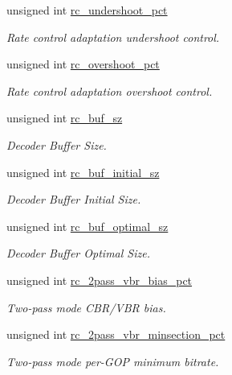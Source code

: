 \begin{DoxyCompactItemize}
unsigned int \hyperlink{structvpx__codec__enc__cfg_ad279fbb0a9fe9395340913161e28651a}{rc\-\_\-undershoot\-\_\-pct}
\begin{DoxyCompactList}\small\item\em \-Rate control adaptation undershoot control. \end{DoxyCompactList}\item 
unsigned int \hyperlink{structvpx__codec__enc__cfg_a4f2fbd015c1b1f395cc4a4b03d4ead5f}{rc\-\_\-overshoot\-\_\-pct}
\begin{DoxyCompactList}\small\item\em \-Rate control adaptation overshoot control. \end{DoxyCompactList}\item 
unsigned int \hyperlink{structvpx__codec__enc__cfg_a61866272bb588cd86d28834f420430f0}{rc\-\_\-buf\-\_\-sz}
\begin{DoxyCompactList}\small\item\em \-Decoder \-Buffer \-Size. \end{DoxyCompactList}\item 
unsigned int \hyperlink{structvpx__codec__enc__cfg_aa9e4d6405994ef42d61d478cf6e0d5e0}{rc\-\_\-buf\-\_\-initial\-\_\-sz}
\begin{DoxyCompactList}\small\item\em \-Decoder \-Buffer \-Initial \-Size. \end{DoxyCompactList}\item 
unsigned int \hyperlink{structvpx__codec__enc__cfg_aafde485867e040a58504ad796e79e47f}{rc\-\_\-buf\-\_\-optimal\-\_\-sz}
\begin{DoxyCompactList}\small\item\em \-Decoder \-Buffer \-Optimal \-Size. \end{DoxyCompactList}\item 
unsigned int \hyperlink{structvpx__codec__enc__cfg_a21c21ff097890dc3a450731c9b504cf4}{rc\-\_\-2pass\-\_\-vbr\-\_\-bias\-\_\-pct}
\begin{DoxyCompactList}\small\item\em \-Two-\/pass mode \-C\-B\-R/\-V\-B\-R bias. \end{DoxyCompactList}\item 
unsigned int \hyperlink{structvpx__codec__enc__cfg_a21eb9fce0844ae07b617bf3f0a25f5a5}{rc\-\_\-2pass\-\_\-vbr\-\_\-minsection\-\_\-pct}
\begin{DoxyCompactList}\small\item\em \-Two-\/pass mode per-\/\-G\-O\-P minimum bitrate. \end{DoxyCompactList}\item 

\end{DoxyCompactItemize}
